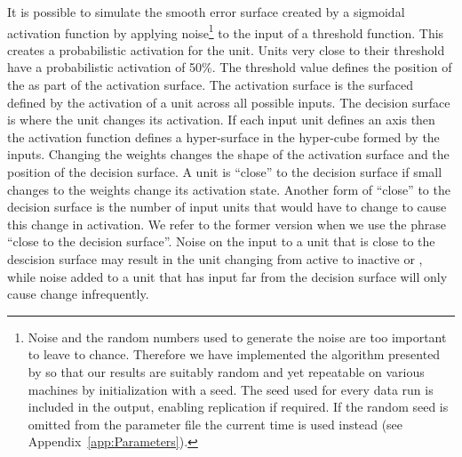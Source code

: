 It is possible to simulate the smooth error surface created by a sigmoidal activation function by applying noise\footnote{Noise and the random numbers used to generate the noise are too important to leave to chance.  Therefore we have implemented the algorithm presented by \citet{Marsaglia1990} so that our results are suitably random and yet repeatable on various machines by initialization with a seed. The seed used for every data run is included in the output, enabling replication if required.  If the random seed is omitted from the parameter file the current time is used instead (see Appendix~\ref{app:Parameters}).} to the input of a threshold function.  This creates a probabilistic activation for the unit.  Units very close to their threshold have a probabilistic activation of 50\%.  The threshold value defines the position of the  as part of the activation surface.  The activation surface is the surfaced defined by the activation of a unit across all possible inputs.  The decision surface is where the unit changes its activation.  If each input unit defines an axis then the activation function defines a hyper-surface in the hyper-cube formed by the inputs.  Changing the weights changes the shape of the activation surface and the position of the decision surface.  A unit is ``close'' to the decision surface if small changes to the weights change its activation state.  Another form of ``close'' to the decision surface is the number of input units that would have to change to cause this change in activation.  We refer to the former version when we use the phrase ``close to the decision surface''.   Noise on the input to a unit that is close to the descision surface may result in the unit changing from active to inactive or , while noise added to a unit that has input far from the decision surface will only cause change infrequently.


